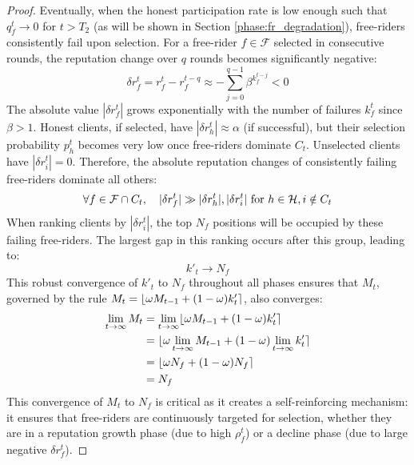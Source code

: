 \documentclass[conference]{IEEEtran}
\newcommand{\HC}{\mathcal{H}}
\newcommand{\FC}{\mathcal{F}}
\DeclarePairedDelimiter{\abs}{\lvert}{\rvert}
\DeclarePairedDelimiter{\round}{\lfloor}{\rceil}
\begin{document}
\begin{proof}
Eventually, when the honest participation rate is low enough such that $q_f^t \to 0$ for $t > T_2$ (as will be shown in Section \ref{phase:fr_degradation}), free-riders consistently fail upon selection. For a free-rider $f \in \FC$ selected in consecutive rounds, the reputation change over $q$ rounds becomes significantly negative:
\begin{equation}
    \delta r_f^t = r_f^t - r_f^{t-q} \approx -\sum_{j=0}^{q-1}\beta^{k_f^{t-j}} < 0
\end{equation}
The absolute value $|\delta r_f^t|$ grows exponentially with the number of failures $k_f^t$ since $\beta > 1$. Honest clients, if selected, have $|\delta r_h^t| \approx \alpha$ (if successful), but their selection probability $p_h^t$ becomes very low once free-riders dominate $C_t$. Unselected clients have $|\delta r_i^t| = 0$. Therefore, the absolute reputation changes of consistently failing free-riders dominate all others:
\begin{equation}
    \forall f \in \FC \cap C_t, \quad \abs{\delta r_f^t} \gg \abs{\delta r_h^t}, \abs{\delta r_i^t} \text{ for } h \in \HC, i \notin C_t
\end{equation}
When ranking clients by $|\delta r_i^t|$, the top $N_f$ positions will be occupied by these failing free-riders. The largest gap in this ranking occurs after this group, leading to:
\begin{equation}
    k'_t \to N_f
\end{equation}
This robust convergence of $k'_t$ to $N_f$ throughout all phases ensures that $M_t$, governed by the rule $M_t = \round{\omega M_{t-1} + (1-\omega) k'_t}$, also converges:
\begin{equation}
\begin{aligned}
    \lim_{t \to \infty} M_t &= \lim_{t \to \infty} \round{\omega M_{t-1} + (1-\omega)k'_t}\\
    &= \round{\omega \lim_{t \to \infty} M_{t-1} + (1-\omega)\lim_{t \to \infty} k'_t}\\
    &= \round{\omega N_f + (1-\omega)N_f}\\
    &= N_f
\end{aligned}
\end{equation}
This convergence of $M_t$ to $N_f$ is critical as it creates a self-reinforcing mechanism: it ensures that free-riders are continuously targeted for selection, whether they are in a reputation growth phase (due to high $\rho_f^t$) or a decline phase (due to large negative $\delta r_f^t$).
\end{proof}
\end{document}
